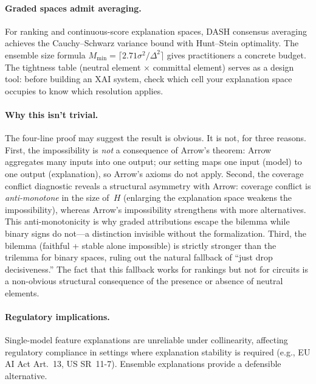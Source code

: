 \paragraph{Graded spaces admit averaging.}
For ranking and continuous-score explanation spaces, DASH consensus averaging achieves the Cauchy--Schwarz variance bound with Hunt--Stein optimality. The ensemble size formula $M_{\min} = \lceil 2.71 \sigma^2/\Delta^2 \rceil$ gives practitioners a concrete budget. The tightness table (neutral element $\times$ committal element) serves as a design tool: before building an XAI system, check which cell your explanation space occupies to know which resolution applies.

\paragraph{Why this isn't trivial.}
The four-line proof may suggest the result is obvious.
It is not, for three reasons.
First, the impossibility is \emph{not} a consequence of Arrow's theorem:
Arrow aggregates many inputs into one output; our setting maps one input
(model) to one output (explanation), so Arrow's axioms do not apply.
Second, the coverage conflict diagnostic reveals a structural asymmetry
with Arrow: coverage conflict is \emph{anti-monotone} in the size of~$H$
(enlarging the explanation space weakens the impossibility), whereas
Arrow's impossibility strengthens with more alternatives.
This anti-monotonicity is why graded attributions escape the bilemma
while binary signs do not---a distinction invisible without the
formalization.
Third, the bilemma (faithful + stable alone impossible) is strictly
stronger than the trilemma for binary spaces, ruling out the natural
fallback of ``just drop decisiveness.''
The fact that this fallback works for rankings but not for circuits is a
non-obvious structural consequence of the presence or absence of neutral
elements.

\paragraph{Regulatory implications.}
Single-model feature explanations are unreliable under collinearity, affecting regulatory compliance in settings where explanation stability is required (e.g., EU AI Act Art.~13, US SR~11-7). Ensemble explanations provide a defensible alternative.


